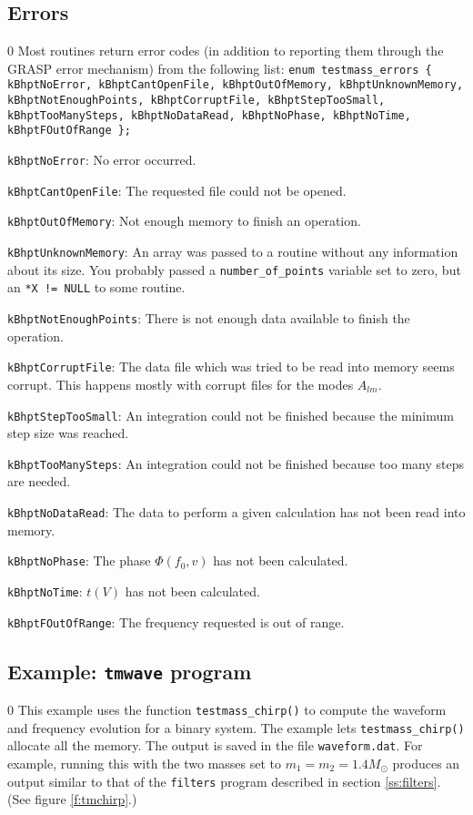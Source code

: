 \subsection{Errors}
\label{tm:errors}
\setcounter{equation}0
Most routines return error codes (in addition to reporting them through
the GRASP error mechanism) from the following list:
{\tt enum testmass\_errors  \{ kBhptNoError, kBhptCantOpenFile, 
	            kBhptOutOfMemory,  kBhptUnknownMemory,    kBhptNotEnoughPoints, 
				kBhptCorruptFile,  kBhptStepTooSmall,  kBhptTooManySteps,  
		        kBhptNoDataRead,   kBhptNoPhase,    kBhptNoTime,    
			    kBhptFOutOfRange	   \};}
\begin{description}
\item{{\tt kBhptNoError}}:  No error occurred.
\item{{\tt kBhptCantOpenFile}}:  The requested file could not
be opened. 
\item{{\tt kBhptOutOfMemory}}: Not enough memory to finish an operation.
\item{{\tt kBhptUnknownMemory}}: An array was passed to a routine without any
information about its size. You probably passed a {\tt number\_of\_points}
variable set to zero, but an {\tt **X != NULL} to some routine.
\item{{\tt kBhptNotEnoughPoints}}:  There is not enough data available to
finish the operation.
\item{{\tt kBhptCorruptFile}}: The data file which was tried to be read into
memory
seems corrupt. This happens mostly with corrupt files for the modes $A_{lm}$.
\item{{\tt kBhptStepTooSmall}}: An integration could not be finished because 
the minimum step size was reached.
\item{{\tt kBhptTooManySteps}}: An integration could not be finished because 
 too many steps are needed.
\item{{\tt kBhptNoDataRead}}: The data to perform a given
calculation has not been read into memory.
\item{{\tt kBhptNoPhase}}:  The phase $\Phi(f_0,v)$ has not been calculated.
\item{{\tt kBhptNoTime}}:  $t(V)$ has not been calculated.
\item{{\tt kBhptFOutOfRange}}:  The frequency requested is out of range.
\end{description}
\clearpage
\subsection{Example: {\tt tmwave} program}
\setcounter{equation}0
This example uses the function {\tt testmass\_chirp()} to compute the waveform and frequency
evolution for a binary system. The example lets {\tt testmass\_chirp()} allocate
all the memory.  The output is saved in the file
{\tt waveform.dat}.
For example, running this with the two masses set to $m_1=m_2 = 1.4 M_\odot$
produces an output similar to that of the {\tt filters} program described in
section \ref{ss:filters}. (See figure \ref{f:tmchirp}.)

